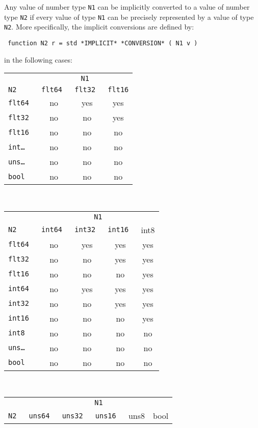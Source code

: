 \documentclass[12pt]{article}
\newenvironment{indpar}[1][0.3in]%
	{\begin{list}{}%
		     {\setlength{\itemsep}{0in}%
		      \setlength{\topsep}{0in}%
		      \setlength{\parsep}{1ex}%
		      \setlength{\labelwidth}{#1}%
		      \setlength{\leftmargin}{#1}%
		      \addtolength{\leftmargin}{\labelsep}}%
	 \item}%
	{\end{list}}
\begin{document}
Any value of number type {\tt N1} can be implicitly converted to a value
of number type {\tt N2} if every value of type {\tt N1} can be
precisely represented by a value of type {\tt N2}.  More specifically,
the implicit conversions are defined by:
\begin{indpar} \tt
function N2 r = std *IMPLICIT* *CONVERSION* ( N1 v )
\end{indpar}
in the following cases:
\begin{center}
\begin{tabular}{l|c|c|c|}
\multicolumn{1}{c}{}	& \multicolumn{3}{c}{\tt N1} \\
\tt N2  & \tt flt64 & \tt flt32 & \tt flt16
\\\hline
\tt flt64 & no & yes & yes \\
\tt flt32 & no & no & yes \\
\tt flt16 & no & no & no
\\\hline
\tt int\ldots{} & no & no & no \\
\tt uns\ldots{} & no & no & no \\
\tt bool & no & no & no
\\\hline
\end{tabular}
\\[2ex]
\begin{tabular}{l|c|c|c|c|}
\multicolumn{1}{c}{}	& \multicolumn{4}{c}{\tt N1} \\
\tt N2  & \tt int64 & \tt int32 & \tt int16 & int8
\\\hline
\tt flt64 & no & yes & yes & yes \\
\tt flt32 & no & no & yes & yes \\
\tt flt16 & no & no & no & yes
\\\hline
\tt int64 & no & yes & yes & yes \\
\tt int32 & no & no & yes & yes \\
\tt int16 & no & no & no & yes \\
\tt int8 & no & no & no & no
\\\hline
\tt uns\ldots{} & no & no & no & no \\
\tt bool & no & no & no & no
\\\hline
\end{tabular}
\\[2ex]
\begin{tabular}{l|c|c|c|c|c|}
\multicolumn{1}{c}{}	& \multicolumn{5}{c}{\tt N1} \\
\tt N2  & \tt uns64 & \tt uns32 & \tt uns16 & uns8 & bool
\\\hline

\end{tabular}
\end{center}
\end{document}
